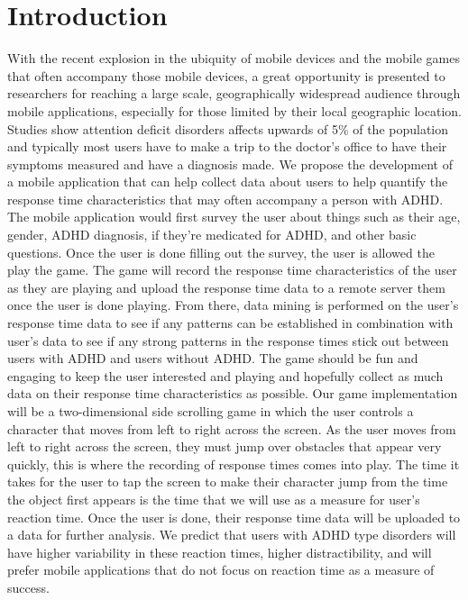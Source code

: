 \documentclass[a4wide]{article}
\begin{document}
\section{Introduction}
\- With the recent explosion in the ubiquity of mobile devices and the mobile games that often accompany those mobile devices, a great opportunity is presented to researchers for reaching a large scale, geographically widespread audience through mobile applications, especially for those limited by their local geographic location. Studies show attention deficit disorders affects upwards of 5\% of the population and typically most users have to make a trip to the doctor's office to have their symptoms measured and have a diagnosis made.
\newline
\newline
\- We propose the development of a mobile application that can help collect data about users to help quantify the response time characteristics that may often accompany a person with ADHD. The mobile application would first survey the user about things such as their age, gender, ADHD diagnosis, if they're medicated for ADHD, and other basic questions. Once the user is done filling out the survey, the user is allowed the play the game. The game will record the response time characteristics of the user as they are playing and upload the response time data to a remote server them once the user is done playing. From there, data mining is performed on the user's response time data to see if any patterns can be established in combination with user's data to see if any strong patterns in the response times stick out between users with ADHD and users without ADHD. The game should be fun and engaging to keep the user interested and playing and hopefully collect as much data on their response time characteristics as possible.
\newline
\newline
\- Our game implementation will be a two-dimensional side scrolling game in which the user controls a character that moves from left to right across the screen. As the user moves from left to right across the screen, they must jump over obstacles that appear very quickly, this is where the recording of response times comes into play. The time it takes for the user to tap the screen to make their character jump from the time the object first appears is the time that we will use as a measure for user's reaction time. Once the user is done, their response time data will be uploaded to a data for further analysis. We predict that users with ADHD type disorders will have higher variability in these reaction times, higher distractibility, and will prefer mobile applications that do not focus on reaction time as a measure of success.
\end{document}
